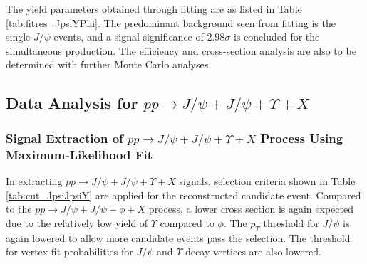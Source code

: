 \documentclass[10pt,twocolumn]{article}
\begin{document}
The yield parameters obtained through fitting are as listed in Table \ref{tab:fitres_JpsiYPhi}. The predominant background seen from fitting is the single-$J/\psi$ events, and a signal significance of $2.98 \sigma$ is concluded for the simultaneous production. The efficiency and cross-section analysis are also to be determined with further Monte Carlo analyses.

\subsection{Data Analysis for $pp\to J/\psi+J/\psi+\Upsilon+X$}

\subsubsection{Signal Extraction of $pp\to J/\psi+J/\psi+\Upsilon+X$ Process Using Maximum-Likelihood Fit}

In extracting $pp\to J/\psi+J/\psi+\Upsilon+X$ signals, selection criteria shown in Table \ref{tab:cut_JpsiJpsiY} are applied for the reconstructed candidate event. Compared to the $pp\to J/\psi+J/\psi+\phi+X$ process, a lower cross section is again expected due to the relatively low yield of $\Upsilon$ compared to $\phi$. The $p_T$ threshold for $J/\psi$ is again lowered to allow more candidate events pass the selection. The threshold for vertex fit probabilities for $J/\psi$ and $\Upsilon$ decay vertices are also lowered.
\end{document}

